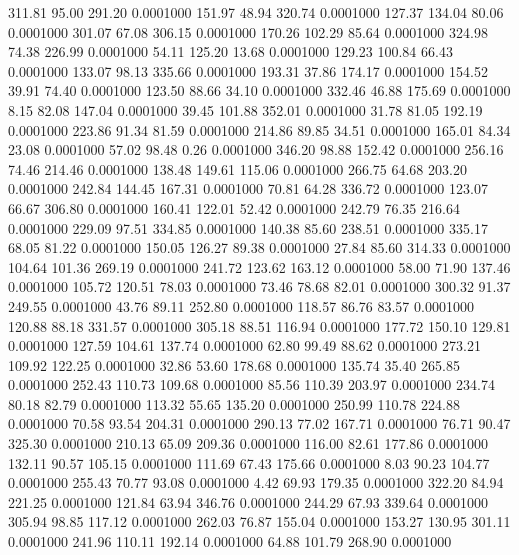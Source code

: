  311.81   95.00  291.20   0.0001000
 151.97   48.94  320.74   0.0001000
 127.37  134.04   80.06   0.0001000
 301.07   67.08  306.15   0.0001000
 170.26  102.29   85.64   0.0001000
 324.98   74.38  226.99   0.0001000
  54.11  125.20   13.68   0.0001000
 129.23  100.84   66.43   0.0001000
 133.07   98.13  335.66   0.0001000
 193.31   37.86  174.17   0.0001000
 154.52   39.91   74.40   0.0001000
 123.50   88.66   34.10   0.0001000
 332.46   46.88  175.69   0.0001000
   8.15   82.08  147.04   0.0001000
  39.45  101.88  352.01   0.0001000
  31.78   81.05  192.19   0.0001000
 223.86   91.34   81.59   0.0001000
 214.86   89.85   34.51   0.0001000
 165.01   84.34   23.08   0.0001000
  57.02   98.48    0.26   0.0001000
 346.20   98.88  152.42   0.0001000
 256.16   74.46  214.46   0.0001000
 138.48  149.61  115.06   0.0001000
 266.75   64.68  203.20   0.0001000
 242.84  144.45  167.31   0.0001000
  70.81   64.28  336.72   0.0001000
 123.07   66.67  306.80   0.0001000
 160.41  122.01   52.42   0.0001000
 242.79   76.35  216.64   0.0001000
 229.09   97.51  334.85   0.0001000
 140.38   85.60  238.51   0.0001000
 335.17   68.05   81.22   0.0001000
 150.05  126.27   89.38   0.0001000
  27.84   85.60  314.33   0.0001000
 104.64  101.36  269.19   0.0001000
 241.72  123.62  163.12   0.0001000
  58.00   71.90  137.46   0.0001000
 105.72  120.51   78.03   0.0001000
  73.46   78.68   82.01   0.0001000
 300.32   91.37  249.55   0.0001000
  43.76   89.11  252.80   0.0001000
 118.57   86.76   83.57   0.0001000
 120.88   88.18  331.57   0.0001000
 305.18   88.51  116.94   0.0001000
 177.72  150.10  129.81   0.0001000
 127.59  104.61  137.74   0.0001000
  62.80   99.49   88.62   0.0001000
 273.21  109.92  122.25   0.0001000
  32.86   53.60  178.68   0.0001000
 135.74   35.40  265.85   0.0001000
 252.43  110.73  109.68   0.0001000
  85.56  110.39  203.97   0.0001000
 234.74   80.18   82.79   0.0001000
 113.32   55.65  135.20   0.0001000
 250.99  110.78  224.88   0.0001000
  70.58   93.54  204.31   0.0001000
 290.13   77.02  167.71   0.0001000
  76.71   90.47  325.30   0.0001000
 210.13   65.09  209.36   0.0001000
 116.00   82.61  177.86   0.0001000
 132.11   90.57  105.15   0.0001000
 111.69   67.43  175.66   0.0001000
   8.03   90.23  104.77   0.0001000
 255.43   70.77   93.08   0.0001000
   4.42   69.93  179.35   0.0001000
 322.20   84.94  221.25   0.0001000
 121.84   63.94  346.76   0.0001000
 244.29   67.93  339.64   0.0001000
 305.94   98.85  117.12   0.0001000
 262.03   76.87  155.04   0.0001000
 153.27  130.95  301.11   0.0001000
 241.96  110.11  192.14   0.0001000
  64.88  101.79  268.90   0.0001000
